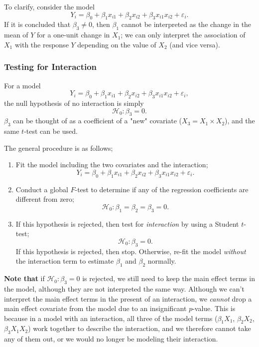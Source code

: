 \documentclass[12pt]{article}
\begin{document}
To clarify, consider the model \[Y_i = \beta_0 + \beta_1 x_{i1} + \beta_2 x_{i2} + \beta_3 x_{i1}x_{i2} + \varepsilon_i.\] If it is concluded that $\beta_3 \neq 0$, then $\beta_1$ cannot be interpreted as the change in the mean of $Y$ for a one-unit change in $X_1$; we can only interpret the association of $X_1$ with the response $Y$ depending on the value of $X_2$ (and vice versa).

\subsubsection{Testing for Interaction}

For a model \[Y_i = \beta_0 + \beta_1 x_{i1} + \beta_2 x_{i2} + \beta_3 x_{i1}x_{i2} + \varepsilon_i,\] the null hypothesis of no interaction is simply \[\mathcal{H}_0: \beta_3 = 0.\] $\beta_3$ can be thought of as a coefficient of a "new" covariate ($X_3 = X_1\times X_2$), and the same $t$-test can be used.

The general procedure is as follows;
\begin{enumerate}
    \item Fit the model including the two covariates and the interaction;\[Y_i = \beta_0 + \beta_1 x_{i1} + \beta_2 x_{i2} + \beta_3 x_{i1}x_{i2} + \varepsilon_i.\]
    \item Conduct a global $F$-test to determine if any of the regression coefficients are different from zero; \[\mathcal{H}_0: \beta_1 = \beta_2 = \beta_3 = 0.\]
    \item If this hypothesis is rejected, then test for \textit{interaction} by using a Student $t$-test; \[\mathcal{H}_0: \beta_3 = 0.\] If this hypothesis is rejected, then stop. Otherwise, re-fit the model \textit{without} the interaction term to estimate $\beta_1$ and $\beta_2$ normally.
\end{enumerate}


\textbf{Note that} if $\mathcal{H}_0: \beta_3 = 0$ is rejected, we still need to keep the main effect terms in the model, although they are not interpreted the same way. Although we can't interpret the main effect terms in the present of an interaction, we \textit{cannot} drop a main effect covariate from the model due to an insignificant $p$-value. This is because in a model with an interaction, all three of the model terms ($\beta_1 X_1$, $\beta_2 X_2$, $\beta_3 X_1 X_2$) work together to describe the interaction, and we therefore cannot take any of them out, or we would no longer be modeling their interaction.
\end{document}

